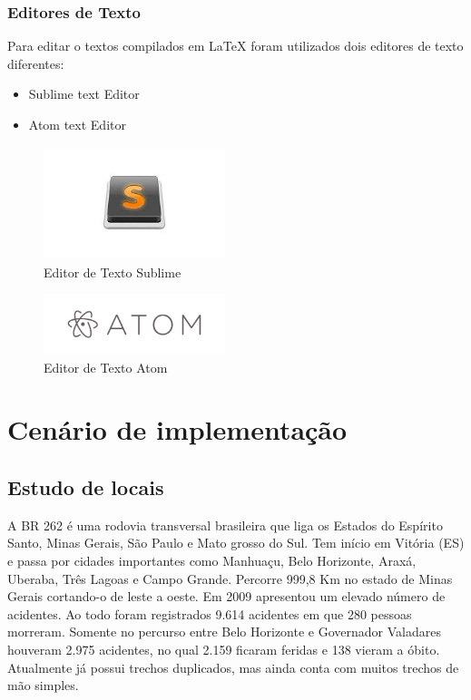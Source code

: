 \subsubsection{Editores de Texto}
\label{sub:Editores de Texto}
Para editar o textos compilados em LaTeX foram utilizados dois editores de texto diferentes:
\begin{itemize}
  \item Sublime text Editor
  \item Atom text Editor
\end{itemize}

\begin{figure}[h]
  \centering
  \includegraphics[width=200px, scale=0.5]{figuras/sublime}
  \caption{Editor de Texto Sublime}
  \label{table:sublime}
\end{figure}
\begin{figure}[h]
  \centering
  \includegraphics[width=200px, scale=0.5]{figuras/atom}
  \caption{Editor de Texto Atom}
  \label{table:atom}
\end{figure}

\section{Cenário de implementação}
\subsection{Estudo de locais}
A BR 262 é uma rodovia transversal brasileira que liga os Estados do Espírito
Santo, Minas Gerais, São Paulo e Mato grosso do Sul. Tem início em Vitória (ES) e
passa por cidades importantes como Manhuaçu, Belo Horizonte, Araxá, Uberaba, Três
Lagoas e Campo Grande. Percorre 999,8 Km no estado de Minas Gerais cortando-o de
leste a oeste. Em 2009 apresentou um elevado número de acidentes. Ao todo foram
registrados 9.614 acidentes em que 280 pessoas morreram. Somente no percurso entre
Belo Horizonte e Governador Valadares houveram 2.975 acidentes, no qual 2.159
ficaram feridas e 138 vieram a óbito. Atualmente já possui trechos duplicados,
mas ainda conta com muitos trechos de mão simples.
\cite{wikipedia}

